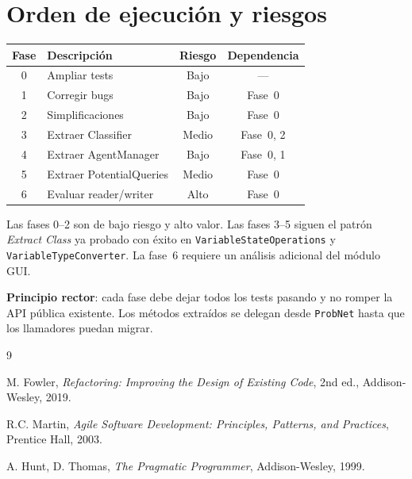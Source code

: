 \documentclass[11pt,a4paper]{article}
\newcommand{\code}[1]{\texttt{#1}}
\begin{document}
\section{Orden de ejecuci\'on y riesgos}

\begin{center}
\begin{tabular}{clcc}
\toprule
\textbf{Fase} & \textbf{Descripci\'on} & \textbf{Riesgo} & \textbf{Dependencia} \\
\midrule
0 & Ampliar tests          & Bajo  & --- \\
1 & Corregir bugs          & Bajo  & Fase~0 \\
2 & Simplificaciones       & Bajo  & Fase~0 \\
3 & Extraer Classifier     & Medio & Fase~0, 2 \\
4 & Extraer AgentManager   & Bajo  & Fase~0, 1 \\
5 & Extraer PotentialQueries & Medio & Fase~0 \\
6 & Evaluar reader/writer  & Alto  & Fase~0 \\
\bottomrule
\end{tabular}
\end{center}

Las fases 0--2 son de bajo riesgo y alto valor.  Las fases 3--5 siguen
el patr\'on \emph{Extract Class} ya probado con \'exito en
\code{VariableStateOperations} y \code{VariableTypeConverter}.  La
fase~6 requiere un an\'alisis adicional del m\'odulo GUI.

\textbf{Principio rector}: cada fase debe dejar todos los tests pasando
y no romper la API p\'ublica existente.  Los m\'etodos extra\'idos se
delegan desde \code{ProbNet} hasta que los llamadores puedan migrar.

\begin{thebibliography}{9}

  M. Fowler,
  \emph{Refactoring: Improving the Design of Existing Code},
  2nd ed., Addison-Wesley, 2019.

  R.C. Martin,
  \emph{Agile Software Development: Principles, Patterns, and Practices},
  Prentice Hall, 2003.

  A. Hunt, D. Thomas,
  \emph{The Pragmatic Programmer},
  Addison-Wesley, 1999.

\end{thebibliography}
\end{document}
